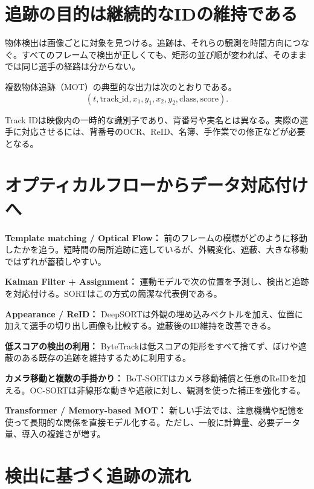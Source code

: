 \documentclass[11pt,a4paper,oneside]{report}
\begin{document}
\section{追跡の目的は継続的なIDの維持である}

\begin{conceptBox}
物体検出は画像ごとに対象を見つける。追跡は、それらの観測を時間方向につなぐ。すべてのフレームで検出が正しくても、矩形の並び順が変われば、そのままでは同じ選手の経路は分からない。
\end{conceptBox}

複数物体追跡（MOT）の典型的な出力は次のとおりである。
\[
(t,\mathrm{track\_id},x_1,y_1,x_2,y_2,\mathrm{class},\mathrm{score}).
\]

Track IDは映像内の一時的な識別子であり、背番号や実名とは異なる。実際の選手に対応させるには、背番号のOCR、ReID、名簿、手作業での修正などが必要となる。

\section{オプティカルフローからデータ対応付けへ}

\begin{historyBox}
\textbf{Template matching / Optical Flow：}\quad
前のフレームの模様がどのように移動したかを追う。短時間の局所追跡に適しているが、外観変化、遮蔽、大きな移動ではずれが蓄積しやすい。

\textbf{Kalman Filter + Assignment：}\quad
運動モデルで次の位置を予測し、検出と追跡を対応付ける。SORTはこの方式の簡潔な代表例である。

\textbf{Appearance / ReID：}\quad
DeepSORTは外観の埋め込みベクトルを加え、位置に加えて選手の切り出し画像も比較する。遮蔽後のID維持を改善できる。

\textbf{低スコアの検出の利用：}\quad
ByteTrackは低スコアの矩形をすべて捨てず、ぼけや遮蔽のある既存の追跡を維持するために利用する。

\textbf{カメラ移動と複数の手掛かり：}\quad
BoT-SORTはカメラ移動補償と任意のReIDを加える。OC-SORTは非線形な動きや遮蔽に対し、観測を使った補正を強化する。

\textbf{Transformer / Memory-based MOT：}\quad
新しい手法では、注意機構や記憶を使って長期的な関係を直接モデル化する。ただし、一般に計算量、必要データ量、導入の複雑さが増す。
\end{historyBox}

\section{検出に基づく追跡の流れ}
\end{document}
